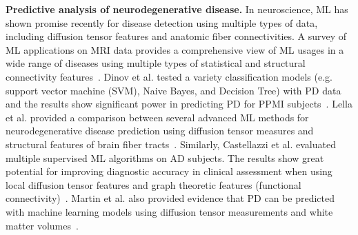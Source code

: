\vspace{1pt}
\noindent\textbf{Predictive analysis of neurodegenerative disease.}
In neuroscience, ML has shown promise recently for disease detection using multiple types of data, including diffusion tensor features and anatomic fiber connectivities. A survey of ML applications on MRI data provides a comprehensive view of ML usages in a wide range of diseases using multiple types of statistical and structural connectivity features~\cite{mateos2018structural}. Dinov et al. tested a variety classification models (e.g. support vector machine (SVM), Naive Bayes, and Decision Tree) with PD data and the results show significant power in predicting PD for PPMI subjects~\cite{dinov2016predictive}. Lella et al. provided a comparison between several advanced ML methods for neurodegenerative disease prediction using diffusion tensor measures and structural features of brain fiber tracts~\cite{10.1117/12.2274140}. Similarly, Castellazzi et al. evaluated multiple supervised ML algorithms on AD subjects. The results show great potential for improving diagnostic accuracy in clinical assessment when using local diffusion tensor features and graph theoretic features (functional connectivity)~\cite{castellazzi2020machine}. Martin et al. also provided evidence that PD can be predicted with machine learning models using diffusion tensor measurements and white matter volumes~\cite{doi:10.1111/jon.12214}.




